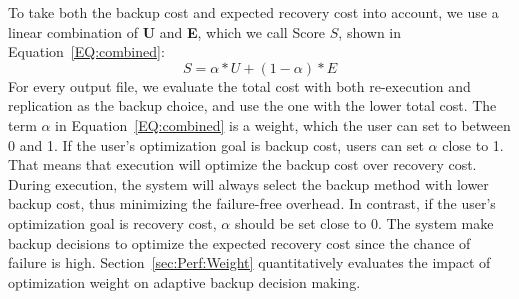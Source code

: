 \documentclass{sig-alternate}
\newcommand{\iannote}[1]{ {\textcolor{red}    { ***Ian:      #1 }}}
\newcommand{\katznote}[1]{ {\textcolor{blue}    { ***Dan:      #1 }}}
\newcommand{\zhaonote}[1]{{\textcolor{cyan}    { ***Zhao:      #1 }}}
\newcommand{\kylenote}[1]{{\textcolor{orange}    { ***Kyle:      #1 }}}
\newcommand{\iannote}[1]{}
\newcommand{\katznote}[1]{}
\newcommand{\zhaonote}[1]{}
\newcommand{\kylenote}[1]{}
\begin{document}
To take both the backup cost and expected recovery cost into account, we use a linear combination of {\bf U} and {\bf E}, which we call %
Score $S$, shown in Equation~\ref{EQ:combined}:
\begin{equation}
S=\alpha*U+(1-\alpha)*E
\label{EQ:combined}
\end{equation}
%
For every output file, we evaluate the total cost with both re-execution and replication as the backup choice, and use the one with the lower total cost.
The term $\alpha$ in Equation~\ref{EQ:combined} is a weight, which the user can set to between 0 and 1. 
 If the user's optimization goal is backup cost, users can set $\alpha$ close to 1.
That means that execution will optimize the backup cost over recovery cost. 
During execution, the system will always select the backup method with lower backup cost, thus minimizing the failure-free overhead.
In contrast, if the user's optimization goal is recovery cost, $\alpha$ should be set close to 0. 
The system make backup decisions to optimize the expected recovery cost since the chance of failure is high. 
Section~\ref{sec:Perf:Weight} quantitatively evaluates the impact of optimization weight on adaptive backup decision making. 
\end{document}
